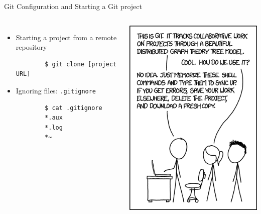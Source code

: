 \begin{frame}[t,fragile]{Git Configuration and Starting a Git project}
\begin{columns}
{\begin{itemize}
      \item \alert{Starting} a project from a \alert{remote} repository
      \begin{lstlisting}
        $ git clone [project URL]
      \end{lstlisting}
    \item \alert{Ignoring} files: \texttt{.gitignore}
      \begin{lstlisting}
        $ cat .gitignore
        *.aux
        *.log
        *~
       \end{lstlisting}
      \end{itemize}
    }
    \begin{center}
      \includegraphics[angle=0,width=\textwidth]{./Figs/git.png}%
    \end{center}
  \end{columns}
  
  
\end{frame}
